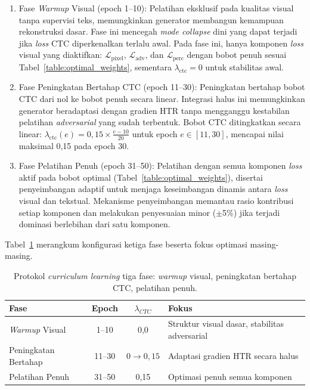 \documentclass[12pt,a4paper]{article}
\begin{document}
\begin{enumerate}[label=\alph*., leftmargin=1.5em, labelsep=0.5em, itemindent=0pt, noitemsep, topsep=0pt]
  \item Fase \textit{Warmup} Visual (epoch 1--10): Pelatihan eksklusif pada kualitas visual tanpa supervisi teks, memungkinkan generator membangun kemampuan rekonstruksi dasar. Fase ini mencegah \textit{mode collapse} dini yang dapat terjadi jika \textit{loss} CTC diperkenalkan terlalu awal. Pada fase ini, hanya komponen \textit{loss} visual yang diaktifkan: $\mathcal{L}_{\text{pixel}}$, $\mathcal{L}_{\text{adv}}$, dan $\mathcal{L}_{\text{perc}}$ dengan bobot penuh sesuai Tabel~\ref{table:optimal_weights}, sementara $\lambda_{\text{ctc}}=0$ untuk stabilitas awal.

  \item Fase Peningkatan Bertahap CTC (epoch 11--30): Peningkatan bertahap bobot CTC dari nol ke bobot penuh secara linear. Integrasi halus ini memungkinkan generator beradaptasi dengan gradien HTR tanpa mengganggu kestabilan pelatihan \textit{adversarial} yang sudah terbentuk. Bobot CTC ditingkatkan secara linear: $\lambda_{\text{ctc}}(e) = 0,15 \times \frac{e - 10}{20}$ untuk epoch $e \in [11, 30]$, mencapai nilai maksimal 0,15 pada epoch 30.

  \item Fase Pelatihan Penuh (epoch 31--50): Pelatihan dengan semua komponen \textit{loss} aktif pada bobot optimal (Tabel~\ref{table:optimal_weights}), disertai penyeimbangan adaptif untuk menjaga keseimbangan dinamis antara \textit{loss} visual dan tekstual. Mekanisme penyeimbangan memantau rasio kontribusi setiap komponen dan melakukan penyesuaian minor ($\pm$5\%) jika terjadi dominasi berlebihan dari satu komponen.
\end{enumerate}

Tabel~\ref{tab:curriculum-learning} merangkum konfigurasi ketiga fase beserta fokus optimasi masing-masing.

\begin{table}[H]
  \caption[Protokol \textit{curriculum learning} tiga fase]{Protokol \textit{curriculum learning} tiga fase: \textit{warmup} visual, peningkatan bertahap CTC, pelatihan penuh.}
  \label{tab:curriculum-learning}
  \small

  \footnotesize
  \begin{tabular}{|l|c|c|p{4.5cm}|}
    \hline
    \textbf{Fase}          & \textbf{Epoch} & \textbf{$\lambda_{CTC}$} & \textbf{Fokus}                                \\
    \hline
    \textit{Warmup} Visual & 1--10          & 0,0                      & Struktur visual dasar, stabilitas adversarial \\
    Peningkatan Bertahap   & 11--30         & $0 \to 0,15$             & Adaptasi gradien HTR secara halus             \\
    Pelatihan Penuh        & 31--50         & 0,15                     & Optimasi penuh semua komponen                 \\
    \hline
  \end{tabular}
\end{table}
\end{document}
